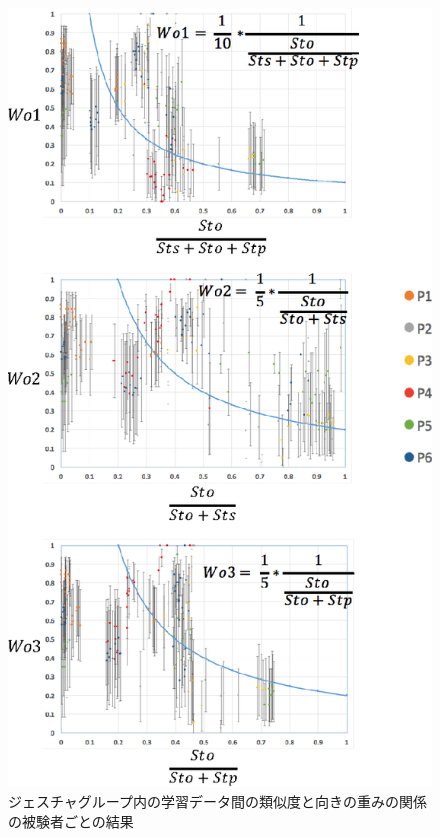 \begin{figure}[!h]
\centering
\includegraphics[width=0.7\columnwidth]{img/weight_orientation.eps}
\caption{ジェスチャグループ内の学習データ間の類似度と向きの重みの関係の被験者ごとの結果}
\label{fig:weight_orientation}
\end{figure}

